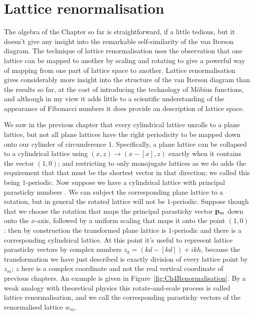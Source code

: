\clearpage
\section{Lattice renormalisation}
The algebra of the Chapter so far is straightforward, if a little tedious, but it doesn't give any insight into the remarkable self-similarity of the van Iterson diagram. The technique of lattice renormalisation uses the observation that one lattice can be mapped to another by scaling and rotating to give a powerful way of mapping from one part of lattice space to another. Lattice renormalisation gives considerably more insight into the structure of the van Iterson diagram than the results so far, at the cost of introducing the technology of M{\"obius} functions, and although in my view it adds little to a scientific understanding of the appearance of Fibonacci numbers it does provide an   description of lattice space.
\label{sec:levitov}

We saw in the previous chapter that every cylindrical lattice unrolls to a plane lattice, but not all plane lattices have the right periodicity to be mapped down onto our cylinder of circumference 1. Specifically, a plane lattice can be collapsed to a cylindrical lattice using $(x,z)\rightarrow(x-\left[x\right],z)$ exactly when it contains the vector $(1,0)$; and restricting to only monojugate lattices as we do adds the requirement that that must be the shortest vector in that direction; we called this being $1$-periodic. 
Now suppose we have a cylindrical lattice with principal parastichy numbers . We can subject the corresponding plane lattice to a rotation, but in general the rotated lattice will not be $1$-periodic. Suppose though that we choose the rotation that maps the principal parastichy vector ${\mathbf p}_{m}$ down onto the $x$-axis, followed by a uniform scaling that maps it onto the point $(1,0)$: then by construction the transformed plane lattice is $1$-periodic and there is a corresponding cylindrical lattice. At this point it's useful to represent lattice parastichy vectors by complex numbers $z_k=(kd-[kd])+i kh$, because the transformation we have just described is exactly division of every lattice point by $z_m$; $z$ here is a complex coordinate and not the real vertical coordinate of previous chapters. 
 An example is given in Figure~\ref{fig:Ch4Renormalisation}. By a weak analogy with theoretical physics this rotate-and-scale process is called lattice renormalisation, and we call the corresponding parastichy vectors of the renormalised lattice $w_m$.




